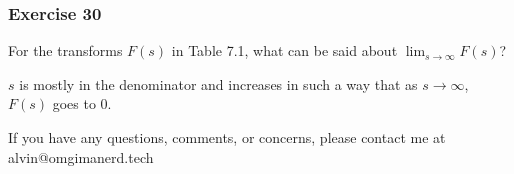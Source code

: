 \documentclass{math}
\begin{document}
\subsubsection*{Exercise 30}
For the transforms \( F(s) \) in Table 7.1, what can be said about
\( \lim_{s\to\infty}F(s) \)?
\par \( s \) is mostly in the denominator and increases in such a way that as
\( s\to\infty \), \( F(s) \) goes to 0.

\begin{center}
  If you have any questions, comments, or concerns, please contact me at
  alvin@omgimanerd.tech
\end{center}
\end{document}
